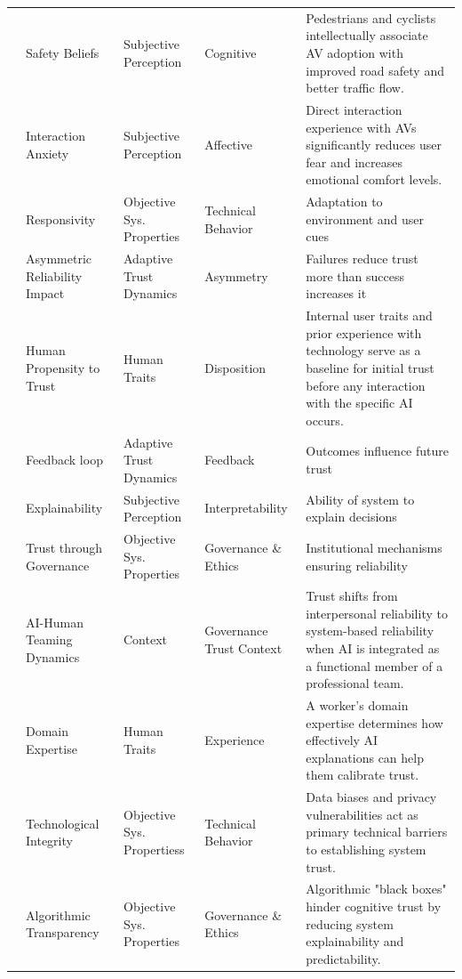 \documentclass[sigconf]{acmart}
\begin{document}
\begin{longtable}{l l l l p{4cm}}
\cite{penmetsa_2019_perceptions_autonomous_vehicles} & Safety Beliefs & Subjective Perception & Cognitive & Pedestrians and cyclists intellectually associate AV adoption with improved road safety and better traffic flow. \\
\cite{penmetsa_2019_perceptions_autonomous_vehicles} & Interaction Anxiety & Subjective Perception & Affective & Direct interaction experience with AVs significantly reduces user fear and increases emotional comfort levels. \\
\cite{chiou_trusting_automation} & Responsivity & Objective Sys. Properties & Technical Behavior & Adaptation to environment and user cues \\
\cite{kaplan2021trust} & Asymmetric Reliability Impact & Adaptive Trust Dynamics & Asymmetry & Failures reduce trust more than success increases it \\
\cite{kaplan2021trust} & Human Propensity to Trust & Human Traits & Disposition & Internal user traits and prior experience with technology serve as a baseline for initial trust before any interaction with the specific AI occurs. \\
\cite{john_measurement_of_trust} & Feedback loop & Adaptive Trust Dynamics & Feedback & Outcomes influence future trust \\
\cite{Buçinca_Proxy_tasks} & Explainability & Subjective Perception & Interpretability & Ability of system to explain decisions \\
\cite{habbal2024artificial} & Trust through Governance & Objective Sys. Properties & Governance \& Ethics & Institutional mechanisms ensuring reliability \\
\cite{larson_LeadingTeamsDigitalAge} & AI-Human Teaming Dynamics & Context & Governance Trust Context & Trust shifts from interpersonal reliability to system-based reliability when AI is integrated as a functional member of a professional team. \\
\cite{Wang_yin_2021} & Domain Expertise & Human Traits & Experience & A worker's domain expertise determines how effectively AI explanations can help them calibrate trust. \\
\cite{wang_2019_artificial_intelligence_future_humanity} & Technological Integrity & Objective Sys. Propertiess & Technical Behavior & Data biases and privacy vulnerabilities act as primary technical barriers to establishing system trust. \\
\cite{wang_2019_artificial_intelligence_future_humanity} & Algorithmic Transparency & Objective Sys. Properties & Governance \& Ethics & Algorithmic "black boxes" hinder cognitive trust by reducing system explainability and predictability. \\

\end{longtable}
\end{document}
